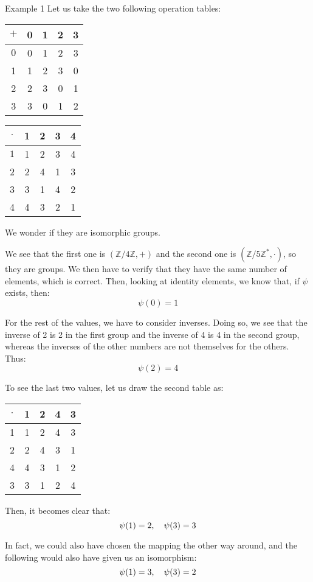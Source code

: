 \documentclass[a4paper]{article}
\begin{document}
\begin{parag}{Example 1}
    Let us take the two following operation tables:
    \begin{center}
    \begin{tabular}{c|cccc}
        $+$ & 0 & 1 & 2 & 3 \\
        \hline
        $0$ & 0 & 1 & 2 & 3 \\
        1 & 1 & 2 & 3 & 0 \\
        2 & 2 & 3 & 0 & 1 \\
        3 & 3 & 0 & 1 & 2
    \end{tabular}
    \hspace{1em}
    \begin{tabular}{c|cccc}
        $\cdot$ & 1 & 2 & 3 & 4 \\
        \hline
        $1$ & 1 & 2 & 3 & 4 \\
        2 & 2 & 4 & 1 & 3 \\
        3 & 3 & 1 & 4 & 2 \\
        4 & 4 & 3 & 2 & 1
    \end{tabular}
    \end{center}

    We wonder if they are isomorphic groups.

    We see that the first one is $\left(\mathbb{Z}/4\mathbb{Z}, +\right)$ and the second one is $\left(\mathbb{Z} / 5\mathbb{Z}^*, \cdot\right)$, so they are groups. We then have to verify that they have the same number of elements, which is correct. Then, looking at identity elements, we know that, if $\psi$ exists, then:
    \[\psi\left(0\right) = 1\]

    For the rest of the values, we have to consider inverses. Doing so, we see that the inverse of 2 is 2 in the first group and the inverse of 4 is 4 in the second group, whereas the inverses of the other numbers are not themselves for the others. Thus:
    \[\psi\left(2\right) = 4\]

    To see the last two values, let us draw the second table as:
    \begin{center}
    \begin{tabular}{c|cccc}
        $\cdot$ & 1 & 2 & 4 & 3 \\
        \hline
        1 & 1 & 2 & 4 & 3 \\
        2 & 2 & 4 & 3 & 1 \\
        4 & 4 & 3 & 1 & 2 \\
        3 & 3 & 1 & 2 & 4 \\
    \end{tabular}
    \end{center}

    Then, it becomes clear that:
    \[\psi\left(1\right) = 2, \mathspace \psi\left(3\right) = 3\]

    In fact, we could also have chosen the mapping the other way around, and the following would also have given us an isomorphism:
    \[\psi\left(1\right) = 3, \mathspace \psi\left(3\right) = 2\]
\end{parag}
\end{document}
